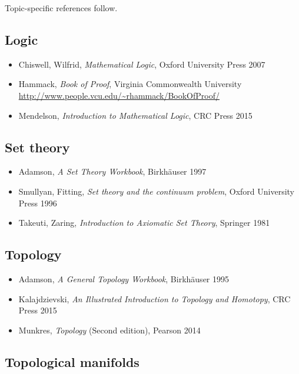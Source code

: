 \noindent Topic-specific references follow.

\subsection*{Logic}

\begin{itemize}
\item Chiswell, Wilfrid, \textit{Mathematical Logic}, Oxford University Press 2007
\item Hammack, \textit{Book of Proof}, Virginia Commonwealth University\\
\url{http://www.people.vcu.edu/~rhammack/BookOfProof/}
\item Mendelson, \textit{Introduction to Mathematical Logic}, CRC Press 2015
\end{itemize}

\subsection*{Set theory}

\begin{itemize}
\item Adamson, \textit{A Set Theory Workbook}, Birkh\"auser 1997
\item Smullyan, Fitting, \textit{Set theory and the continuum problem}, Oxford University Press 1996
\item Takeuti, Zaring, \textit{Introduction to Axiomatic Set Theory}, Springer 1981
\end{itemize}

\subsection*{Topology}

\begin{itemize}
\item Adamson, \textit{A General Topology Workbook}, Birkh\"auser 1995
\item Kalajdzievski, \textit{An Illustrated Introduction to Topology and Homotopy}, CRC Press 2015
\item Munkres, \textit{Topology} (Second edition), Pearson 2014
\end{itemize}

\subsection*{Topological manifolds}

